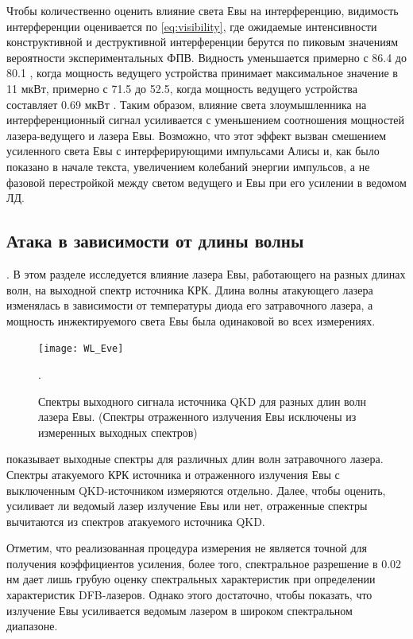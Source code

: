Чтобы количественно оценить влияние света Евы на интерференцию, видимость интерференции оценивается по \cref{eq:visibility}, где ожидаемые интенсивности конструктивной и деструктивной интерференции берутся по пиковым значениям вероятности экспериментальных ФПВ. Видность уменьшается примерно с 86.4 до 80.1 , когда мощность ведущего устройства принимает максимальное значение в 11 мкВт, примерно с 71.5 до 52.5, когда мощность ведущего устройства составляет 0.69 мкВт . Таким образом, влияние света злоумышленника на интерференционный сигнал усиливается с уменьшением соотношения мощностей лазера-ведущего и лазера Евы. Возможно, что этот эффект вызван смешением усиленного света Евы с интерферирующими импульсами Алисы и, как было показано в начале текста, увеличением колебаний энергии импульсов, а не фазовой перестройкой между светом ведущего и Евы при его усилении в ведомом ЛД.
\subsection{Атака в зависимости от длины волны}.
В этом разделе исследуется влияние лазера Евы, работающего на разных длинах волн, на выходной спектр источника КРК. Длина волны атакующего лазера изменялась в зависимости от температуры диода его затравочного лазера, а мощность инжектируемого света Евы была одинаковой во всех измерениях.

\begin{figure}
\texttt{[image: WL\_Eve]}
\caption{Спектры выходного сигнала источника QKD для разных длин волн лазера Евы. (Спектры отраженного излучения Евы исключены из измеренных выходных спектров)}.
\label{fig:WL_Eve}
\end{figure}

 показывает выходные спектры для различных длин волн затравочного лазера. Спектры атакуемого КРК источника и отраженного излучения Евы с выключенным QKD-источником измеряются отдельно. Далее, чтобы оценить, усиливает ли ведомый лазер излучение Евы или нет, отраженные спектры вычитаются из спектров атакуемого источника QKD.

Отметим, что реализованная процедура измерения не является точной для получения коэффициентов усиления, более того, спектральное разрешение в 0.02 нм дает лишь грубую оценку спектральных характеристик при определении характеристик DFB-лазеров. Однако этого достаточно, чтобы показать, что излучение Евы усиливается ведомым лазером в широком спектральном диапазоне.

